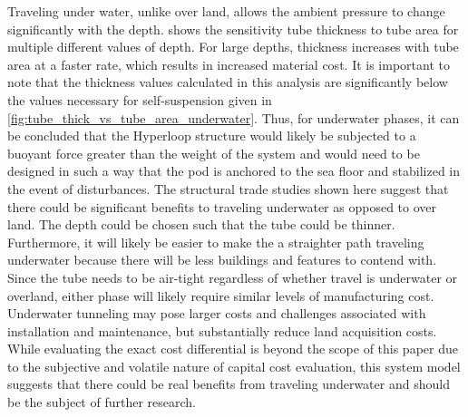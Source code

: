 Traveling under water, unlike over land, allows the ambient pressure to change
significantly with the depth. 
shows the sensitivity tube thickness to tube area for multiple different values of depth.
For large depths, thickness increases with tube area at a faster rate, which
results in increased material cost. It is important to note that the thickness
values calculated in this analysis are significantly below the values necessary
for self-suspension given in \cref{fig:tube_thick_vs_tube_area_underwater}. Thus, for
underwater phases, it can be concluded that the Hyperloop structure would
likely be subjected to a buoyant force greater than the weight of the system
and would need to be designed in such a way that the pod is anchored to the sea
floor and stabilized in the event of disturbances.
The structural trade studies shown here suggest that there could be significant
benefits to traveling underwater as opposed to over land. The depth could be
chosen such that the tube could be thinner. Furthermore, it will likely be
easier to make the a straighter path traveling underwater because there will be
less buildings and features to contend with. Since the tube needs to be
air-tight regardless of whether travel is underwater or overland, either phase
will likely require similar levels of manufacturing cost. Underwater tunneling
may pose larger costs and challenges associated with installation and maintenance,
but substantially reduce land acquisition costs. While evaluating the
exact cost differential is beyond the scope of this paper due to the subjective
and volatile nature of capital cost evaluation, this system model suggests that
there could be real benefits from traveling underwater and should be the subject of further research.
